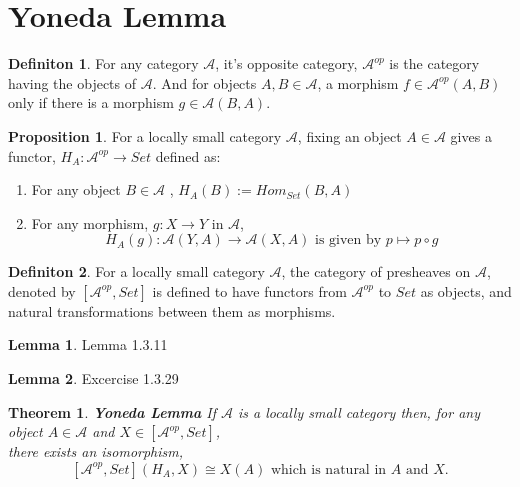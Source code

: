 \documentclass[18pt,a4paper]{article}
\newtheorem{theorem}{Theorem}[section]
\theoremstyle{definition}
\newtheorem{definition}{Definiton}[section]
\newtheorem{lemma}{Lemma}[definition]
\newtheorem{proop}{Proposition}[section]
\begin{document}
\section{Yoneda Lemma} %
\begin{definition} %
For any category $\mathcal{A} $, it's opposite category, $\mathcal{A}^{op}$
is the category having the objects of $\mathcal{A}$.
And for objects $A,B \in \mathcal{A} $, a morphism $f \in \mathcal{A}^{op} (A,B)$
only if there is a morphism $g \in \mathcal{A}(B,A)$.
\end{definition}
\begin{proop} %
	For a locally small category $\mathcal{A}$, fixing an object $A \in \mathcal{A} $ gives
	a functor, $H_A: \mathcal{A} ^{op} \rightarrow Set$ defined as:
	\begin{enumerate}[label=(\roman*)]
		\item For any object $B \in \mathcal{A} $ , $H_A(B):=Hom_{Set}^{}(B,A)$
		\item For any morphism, $g : X \rightarrow Y $ in $\mathcal{A}$,
			\[H_A(g): \mathcal{A} (Y,A) \rightarrow \mathcal{A}(X,A)
				\text{ is given by } p \mapsto p \circ g\]
	\end{enumerate}
\end{proop}
\begin{definition} %
	For a locally small category $\mathcal{A} $, the category of presheaves on $\mathcal{A} $, denoted by $[\mathcal{A} ^{op},Set]$
	is defined to have functors from $\mathcal{A} ^{op}$ to $Set$ as objects,
	and natural transformations between them as morphisms.
\end{definition}

\begin{lemma}
	Lemma 1.3.11
\end{lemma}
\begin{lemma}
	Excercise 1.3.29
\end{lemma}

\begin{theorem}{\textbf{Yoneda Lemma}} %
	If $\mathcal{A} $ is a locally small category then, for any object $A \in \mathcal{A} $
	and $X \in [ \mathcal{A}^{op},Set]$,\\ there exists an isomorphism,
	\[ [ \mathcal{A} ^{op},Set ](H_A,X)\cong X(A) \text{ which is natural in } A \text{ and } X.\]
\end{theorem}
\end{document}
